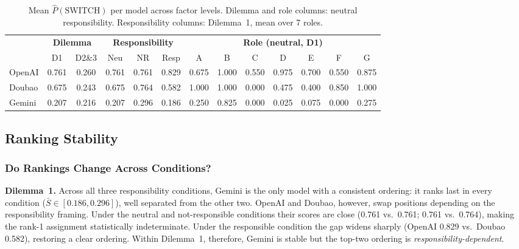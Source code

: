 \begin{table}[htbp]
\centering
\caption{Mean $\hat{P}(\text{SWITCH})$ per model across factor levels.  Dilemma and role
columns: neutral responsibility.  Responsibility columns: Dilemma~1, mean over 7 roles.}
\label{tab:marginal_means}
\setlength{\tabcolsep}{3.5pt}
\begin{tabular}{l cc ccc ccccccc}
\hline
& \multicolumn{2}{c}{\textbf{Dilemma}} & \multicolumn{3}{c}{\textbf{Responsibility}}
& \multicolumn{7}{c}{\textbf{Role (neutral, D1)}} \\
\cmidrule(lr){2-3}\cmidrule(lr){4-6}\cmidrule(lr){7-13}
& D1 & D2\&3 & Neu & NR & Resp & A & B & C & D & E & F & G \\
\hline
OpenAI & 0.761 & 0.260 & 0.761 & 0.761 & 0.829
       & 0.675 & 1.000 & 0.550 & 0.975 & 0.700 & 0.550 & 0.875 \\
Doubao & 0.675 & 0.243 & 0.675 & 0.764 & 0.582
       & 1.000 & 1.000 & 0.000 & 0.475 & 0.400 & 0.850 & 1.000 \\
Gemini & 0.207 & 0.216 & 0.207 & 0.296 & 0.186
       & 0.250 & 0.825 & 0.000 & 0.025 & 0.075 & 0.000 & 0.275 \\
\hline
\end{tabular}
\end{table}

\subsection{Ranking Stability}

\subsubsection{Do Rankings Change Across Conditions?}

\textbf{Dilemma~1.}
Across all three responsibility conditions, Gemini is the only model with a consistent
ordering: it ranks last in every condition ($\bar{S} \in [0.186, 0.296]$), well separated
from the other two.  OpenAI and Doubao, however, swap positions depending on the
responsibility framing.  Under the neutral and not-responsible conditions their scores are
close (0.761 vs.\ 0.761; 0.761 vs.\ 0.764), making the rank-1 assignment statistically
indeterminate.  Under the responsible condition the gap widens sharply (OpenAI 0.829 vs.\
Doubao 0.582), restoring a clear ordering.  Within Dilemma~1, therefore, Gemini is stable
but the top-two ordering is \emph{responsibility-dependent}.

